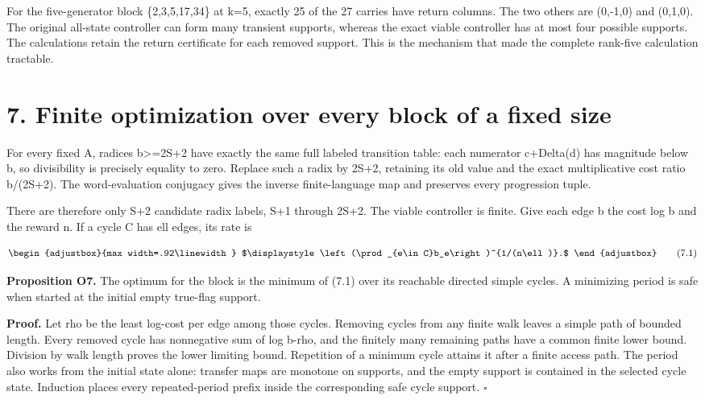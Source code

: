 For the five-generator block \{2,3,5,17,34\} at k=5, exactly 25 of the 27 carries have return columns. The two others are (0,-1,0) and (0,1,0). The original all-state controller can form many transient supports, whereas the exact viable controller has at most four possible supports. The calculations retain the return certificate for each removed support. This is the mechanism that made the complete rank-five calculation tractable.

\section{7. Finite optimization over every block of a fixed size}\label{n04-finite-optimization-over-every-block-of-a-fixed-size}

For every fixed A, radices b\textgreater=2S+2 have exactly the same full labeled transition table: each numerator c+Delta(d) has magnitude below b, so divisibility is precisely equality to zero. Replace such a radix by 2S+2, retaining its old value and the exact multiplicative cost ratio b/(2S+2). The word-evaluation conjugacy gives the inverse finite-language map and preserves every progression tuple.

There are therefore only S+2 candidate radix labels, S+1 through 2S+2. The viable controller is finite. Give each edge b the cost log b and the reward n. If a cycle C has ell edges, its rate is

\[
\begin{adjustbox}{max width=.92\linewidth}
$\displaystyle \left(\prod_{e\in C}b_e\right)^{1/(n\ell)}.$
\end{adjustbox}
\tag{7.1}
\]

\textbf{Proposition O7.} The optimum for the block is the minimum of (7.1) over its reachable directed simple cycles. A minimizing period is safe when started at the initial empty true-flag support.

\textbf{Proof.} Let rho be the least log-cost per edge among those cycles. Removing cycles from any finite walk leaves a simple path of bounded length. Every removed cycle has nonnegative sum of log b-rho, and the finitely many remaining paths have a common finite lower bound. Division by walk length proves the lower limiting bound. Repetition of a minimum cycle attains it after a finite access path. The period also works from the initial state alone: transfer maps are monotone on supports, and the empty support is contained in the selected cycle state. Induction places every repeated-period prefix inside the corresponding safe cycle support. \ensuremath{\square}


